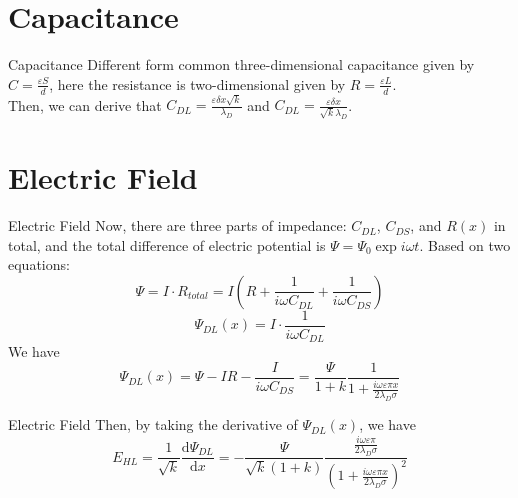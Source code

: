 \documentclass[12pt]{beamer}
\begin{document}
\section{Capacitance}
\begin{frame}{Capacitance}
    Different form common three-dimensional capacitance given by $C=\frac{\varepsilon S}{d}$, here the resistance is two-dimensional given by $R=\frac{\varepsilon L}{d}$.\\
    Then, we can derive that $C_{DL}=\frac{\varepsilon\delta x\sqrt{k}}{\lambda_D}$ and $C_{DL}=\frac{\varepsilon\delta x}{\sqrt{k}\lambda_D}$.
\end{frame}
\section{Electric Field}
\begin{frame}{Electric Field}
    Now, there are three parts of impedance: $C_{DL}$, $C_{DS}$, and $R(x)$ in total, and the total difference of electric potential is $\Psi=\Psi_0\exp{i\omega t}$.
    Based on two equations:\\
    \[\Psi=I\cdot R_{total}=I(R+\frac{1}{i\omega C_{DL}}+\frac{1}{i\omega C_{DS}})\]
    \[\Psi_{DL}(x)=I\cdot\frac{1}{i\omega C_{DL}}\]
    We have\\
    \[\Psi_{DL}(x)=\Psi-IR-\frac{I}{i\omega C_{DS}}=\frac{\Psi}{1+k}\frac{1}{1+\frac{i\omega\varepsilon\pi x}{2\lambda_D\sigma}}\]
\end{frame}
\begin{frame}{Electric Field}
    Then, by taking the derivative of $\Psi_{DL}(x)$, we have\\
    \[E_{HL}=\frac{1}{\sqrt{k}}\frac{\mathrm{d}\Psi_{DL}}{\mathrm{d}x}=-\frac{\Psi}{\sqrt{k}(1+k)}\frac{\frac{i\omega\varepsilon\pi}{2\lambda_D\sigma}}{(1+\frac{i\omega\varepsilon\pi x}{2\lambda_D\sigma})^2}\]
\end{frame}
\end{document}
